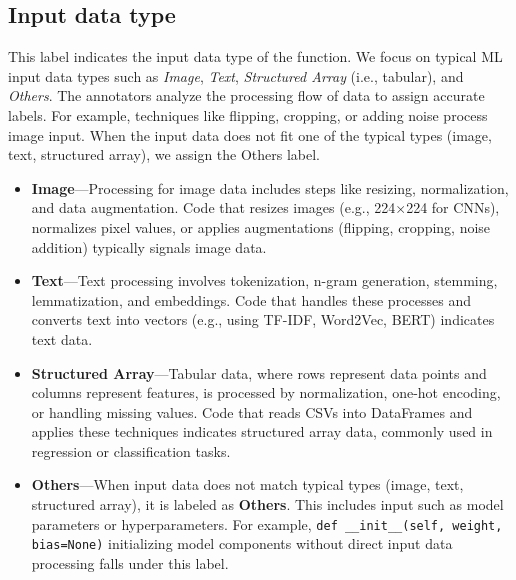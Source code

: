 

\subsection{Input data type}

This label indicates the input data type of the function. We focus on typical ML input data types such as \textit{Image}, \textit{Text}, \textit{Structured Array} (i.e., tabular), and \textit{Others}. The annotators analyze the processing flow of data to assign accurate labels. For example, techniques like flipping, cropping, or adding noise process image input. When the input data does not fit one of the typical types (image, text, structured array), we assign the Others label. 

\begin{itemize}
    
    \item \textbf{Image}---Processing for image data includes steps like resizing, normalization, and data augmentation. Code that resizes images (e.g., 224$\times$224 for CNNs), normalizes pixel values, or applies augmentations (flipping, cropping, noise addition) typically signals image data\cite{krizhevsky2012imagenet}.

    \item \textbf{Text}---Text processing involves tokenization, n-gram generation, stemming, lemmatization, and embeddings. Code that handles these processes and converts text into vectors (e.g., using TF-IDF, Word2Vec, BERT) indicates text data\cite{liu2018neural}.

    \item \textbf{Structured Array}---Tabular data, where rows represent data points and columns represent features, is processed by normalization, one-hot encoding, or handling missing values. Code that reads CSVs into DataFrames and applies these techniques indicates structured array data, commonly used in regression or classification tasks\cite{chen2016xgboost}.

    \item \textbf{Others}---When input data does not match typical types (image, text, structured array), it is labeled as \textbf{Others}. This includes input such as model parameters or hyperparameters. For example, \verb|def __init__(self, weight, bias=None)| initializing model components without direct input data processing falls under this label.

\end{itemize}

